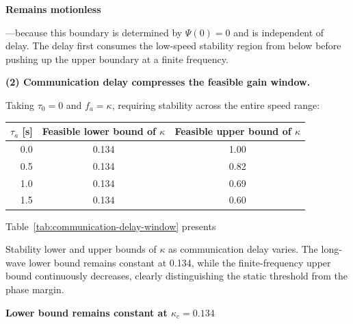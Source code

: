 \documentclass[11pt,a4paper,openany]{book}
\numberwithin{equation}{chapter}
\numberwithin{figure}{chapter}
\numberwithin{table}{chapter}
\newcommand{\tabletext}[2]{%
  \par\smallskip\noindent
  Table~\ref{#1} presents #2
\par\smallskip
}
\begin{document}
\textbf{Remains motionless}

—because this boundary is determined by $\Psi(0)=0$ and is independent of delay. The delay first consumes the low-speed stability region from below before pushing up the upper boundary at a finite frequency.



\textbf{(2) Communication delay compresses the feasible gain window.}

Taking $\tau_0=0$ and $f_a=\kappa$, requiring stability across the entire speed range:



\begin{center}
\label{tab:communication-delay-window}
\begin{tabular}{rcc}
\toprule
$\tau_a$ [s] &

Feasible lower bound of $\kappa$

&

Feasible upper bound of $\kappa$
\\
\midrule
0.0 & 0.134 & 1.00 \\
0.5 & 0.134 & 0.82 \\
1.0 & 0.134 & 0.69 \\
1.5 & 0.134 & 0.60 \\
\bottomrule
\end{tabular}
\end{center}
\tabletext{tab:communication-delay-window}{

Stability lower and upper bounds of $\kappa$ as communication delay varies. The long-wave lower bound remains constant at 0.134, while the finite-frequency upper bound continuously decreases, clearly distinguishing the static threshold from the phase margin.
}

\textbf{Lower bound remains constant at $\kappa_c=0.134$}
\end{document}
